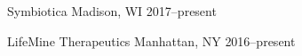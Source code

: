 



\begin{cvhonors}


  \cvhonor
    {Symbiotica} %
    {Madison, WI} %
    {2017--present} %
    
  \cvhonor
    {LifeMine Therapeutics} %
    {Manhattan, NY} %
    {2016--present} %

\end{cvhonors}